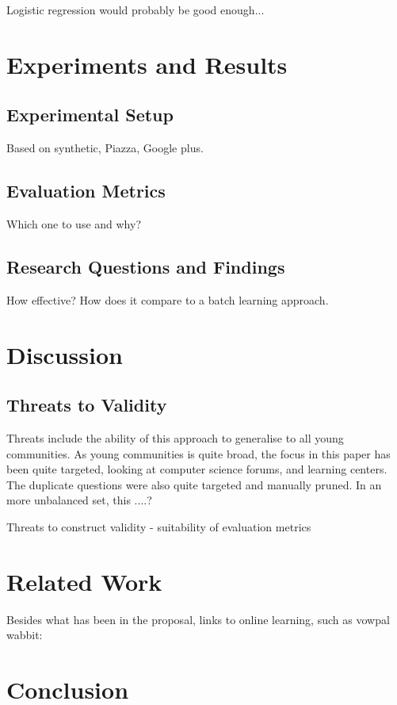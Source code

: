 \documentclass[journal,12pt,onecolumn,draftclsnofoot,]{IEEEtran}
\begin{document}
Logistic regression would probably be good enough...

\section{Experiments and Results}

\subsection{Experimental Setup}

Based on synthetic, Piazza, Google plus. 

\subsection{Evaluation Metrics}

Which one to use and why?

\subsection{Research Questions and Findings}

How effective? How does it compare to a batch learning approach.

\section{Discussion}

\subsection{Threats to Validity}

Threats include the ability of this approach to generalise to all young communities. As young communities is quite broad, the focus in this paper has been quite targeted, looking at computer science forums, and learning centers. The duplicate questions were also quite targeted and manually pruned. In an more unbalanced set, this ....?

Threats to construct validity - suitability of evaluation metrics

\section{Related Work}

Besides what has been in the proposal, links to online learning, such as vowpal wabbit:

\section{Conclusion}
\end{document}
